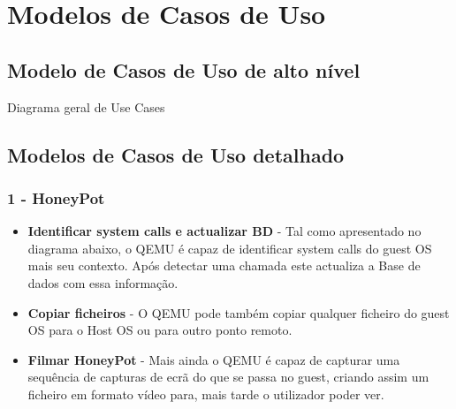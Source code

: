 \section{Modelos de Casos de Uso}
\subsection{Modelo de Casos de Uso de alto nível}


Diagrama geral de Use Cases

\subsection{Modelos de Casos de Uso detalhado}


\subsubsection{\textbf{1 - HoneyPot}}

\begin{itemize}
 \item \textbf{Identificar system calls e actualizar BD} -  Tal como apresentado no diagrama abaixo, o QEMU é capaz de identificar system calls
 do guest OS mais seu contexto. Após detectar uma chamada este actualiza a Base de dados com essa informação. 
 \item \textbf{Copiar ficheiros} - O QEMU pode também copiar qualquer ficheiro do guest OS para o Host OS ou para outro ponto remoto.
 \item \textbf{Filmar HoneyPot} - Mais ainda o QEMU é capaz de capturar uma sequência de capturas de ecrã do que se passa no guest, 
 criando assim um ficheiro em formato vídeo para, mais tarde o utilizador poder ver.
 \end{itemize}


